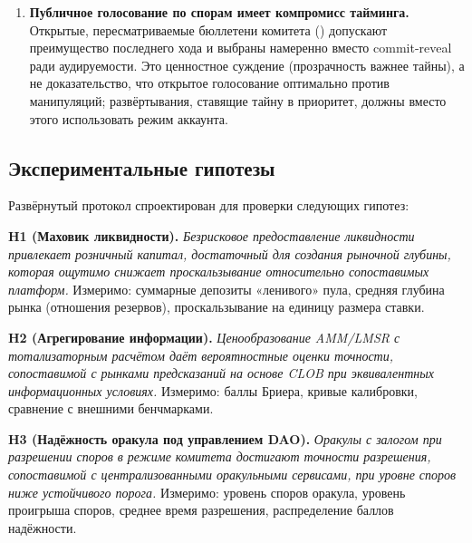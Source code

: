 \documentclass{ledger}
\theoremstyle{plain}
\theoremstyle{remark}
\begin{document}
\begin{enumerate}
  headroom), но ценой того, что ранний выход становится капнутой, упорядоченной по
  FIFO, зависящей от исхода выплатой, а не обналичиванием по кривой (mark-to-curve).
  Кап $c$ --- это выбор политики управления: слишком низкий кап делает ранний выход
  непривлекательным и истончает вторичную ликвидность, слишком высокий кап размывает
  награду держателям --- а в углу с высокими комиссиями ограничение расчёта далее
  сжимает эффективный бакет, чтобы сохранить платёжеспособность, углубляя урезание
  раннего выхода. Нахождение значения, которое максимизирует вторичную ликвидность, не
  отбивая охоту удерживать, --- эмпирический вопрос (, H8), а не
  тот, что решает теория.
  \item \textbf{Публичное голосование по спорам имеет компромисс тайминга.} Открытые,
  пересматриваемые бюллетени комитета () допускают преимущество
  последнего хода и выбраны намеренно вместо commit-reveal ради аудируемости. Это
  ценностное суждение (прозрачность важнее тайны), а не доказательство, что открытое
  голосование оптимально против манипуляций; развёртывания, ставящие тайну в
  приоритет, должны вместо этого использовать режим аккаунта.
\end{enumerate}

\subsection{Экспериментальные гипотезы}\label{sec:hypotheses}

Развёрнутый протокол спроектирован для проверки следующих гипотез:

\textbf{H1 (Маховик ликвидности).} \emph{Безрисковое предоставление ликвидности
привлекает розничный капитал, достаточный для создания рыночной глубины, которая
ощутимо снижает проскальзывание относительно сопоставимых платформ.} Измеримо:
суммарные депозиты «ленивого» пула, средняя глубина рынка (отношения резервов),
проскальзывание на единицу размера ставки.

\textbf{H2 (Агрегирование информации).} \emph{Ценообразование AMM/LMSR с
тотализаторным расчётом даёт вероятностные оценки точности, сопоставимой с рынками
предсказаний на основе CLOB при эквивалентных информационных условиях.} Измеримо:
баллы Бриера, кривые калибровки, сравнение с внешними бенчмарками.

\textbf{H3 (Надёжность оракула под управлением DAO).} \emph{Оракулы с залогом при
разрешении споров в режиме комитета достигают точности разрешения, сопоставимой с
централизованными оракульными сервисами, при уровне споров ниже устойчивого порога.}
Измеримо: уровень споров оракула, уровень проигрыша споров, среднее время разрешения,
распределение баллов надёжности.
\end{document}
